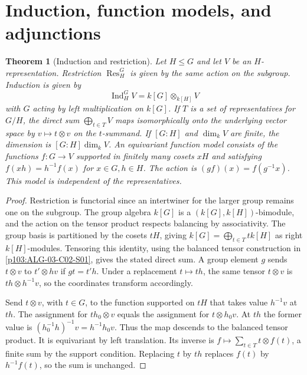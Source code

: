 \documentclass[11pt,oneside,openany]{book}
\newtheorem{theorem}{Theorem}[chapter]
\theoremstyle{definition}
\theoremstyle{remark}
\begin{document}
\section{Induction, function models, and adjunctions}

\begin{theorem}[Induction and restriction]
\label{p103:ALG-07-C03-R01}
Let \(H\le G\) and let \(V\) be an \(H\)-representation. Restriction
\(\operatorname{Res}_H^G\) is given by the same action on the subgroup.
Induction is given by
\[
 \operatorname{Ind}_H^G V=k[G]\otimes_{k[H]}V
\]
with \(G\) acting by left multiplication on \(k[G]\).
If \(T\) is a set of representatives for \(G/H\), the direct sum
\(\bigoplus_{t\in T}V\) maps isomorphically onto the underlying
vector space by \(v\mapsto t\otimes v\) on the \(t\)-summand.
If \([G:H]\) and \(\dim_k V\) are finite, the dimension is
\([G:H]\dim_k V\). An equivariant function model consists of the
functions \(f\colon G\to V\) supported in finitely many cosets
\(xH\) and satisfying \(f(xh)=h^{-1}f(x)\) for \(x\in G,h\in H\).
The action is \((gf)(x)=f(g^{-1}x)\). This model is independent of
the representatives.
\end{theorem}

\begin{proof}
Restriction is functorial since an intertwiner for the larger
group remains one on the subgroup. The group algebra \(k[G]\)
is a \((k[G],k[H])\)-bimodule, and the action on the tensor product
respects balancing by associativity. The group basis is partitioned
by the cosets \(tH\), giving \(k[G]=\bigoplus_{t\in T}t k[H]\)
as right \(k[H]\)-modules.
Tensoring this identity, using the balanced tensor construction
in \ref{p103:ALG-03-C02-S01}, gives the stated direct sum.
A group element \(g\) sends \(t\otimes v\) to \(t'\otimes hv\)
if \(gt=t'h\). Under a replacement \(t\mapsto th\), the same
tensor \(t\otimes v\) is \(th\otimes h^{-1}v\), so the
coordinates transform accordingly.

Send \(t\otimes v\), with \(t\in G\), to the function supported
on \(tH\) that takes value \(h^{-1}v\) at \(th\).
The assignment for \(th_0\otimes v\) equals the assignment for
\(t\otimes h_0v\). At \(th\) the former value is
\((h_0^{-1}h)^{-1}v=h^{-1}h_0v\). Thus the map descends to the
balanced tensor product. It is equivariant by left translation.
Its inverse is \(f\mapsto\sum_{t\in T} t\otimes f(t)\), a finite
sum by the support condition. Replacing \(t\) by \(th\) replaces
\(f(t)\) by \(h^{-1}f(t)\), so the sum is unchanged.
\end{proof}
\end{document}
